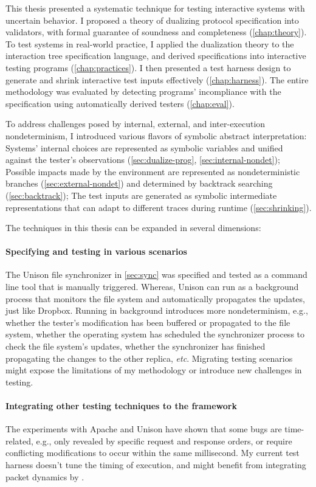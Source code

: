 This thesis presented a systematic technique for testing interactive systems
with uncertain behavior.  I proposed a theory of dualizing protocol
specification into validators, with formal guarantee of soundness and
completeness (\autoref{chap:theory}).  To test systems in real-world practice, I
applied the dualization theory to the interaction tree specification language,
and derived specifications into interactive testing programs
(\autoref{chap:practices}).  I then presented a test harness design to generate
and shrink interactive test inputs effectively (\autoref{chap:harness}).  The
entire methodology was evaluated by detecting programs' incompliance with the
specification using automatically derived testers (\autoref{chap:eval}).

To address challenges posed by internal, external, and inter-execution
nondeterminism, I introduced various flavors of symbolic abstract
interpretation: Systems' internal choices are represented as symbolic variables
and unified against the tester's observations (\autoref{sec:dualize-prog},
\autoref{sec:internal-nondet}); Possible impacts made by the environment are
represented as nondeterministic branches (\autoref{sec:external-nondet}) and
determined by backtrack searching (\autoref{sec:backtrack}); The test inputs are
generated as symbolic intermediate representations that can adapt to different
traces during runtime (\autoref{sec:shrinking}).

The techniques in this thesis can be expanded in several dimensions:
\paragraph{Specifying and testing in various scenarios}
The Unison file synchronizer in \autoref{sec:sync} was specified and tested as a
command line tool that is manually triggered.  Whereas, Unison can run as a
background process that monitors the file system and automatically propagates
the updates, just like Dropbox.  Running in background introduces more
nondeterminism, e.g., whether the tester's modification has been buffered or
propagated to the file system, whether the operating system has scheduled the
synchronizer process to check the file system's updates, whether the
synchronizer has finished propagating the changes to the other replica, {\it
etc}.  Migrating testing scenarios might expose the limitations of my
methodology or introduce new challenges in testing.

\paragraph{Integrating other testing techniques to the framework}
The experiments with Apache and Unison have shown that some bugs are
time-related, e.g., only revealed by specific request and response orders, or
require conflicting modifications to occur within the same millisecond.  My
current test harness doesn't tune the timing of execution, and might benefit
from integrating packet dynamics by \citet{pkt-dyn}.

